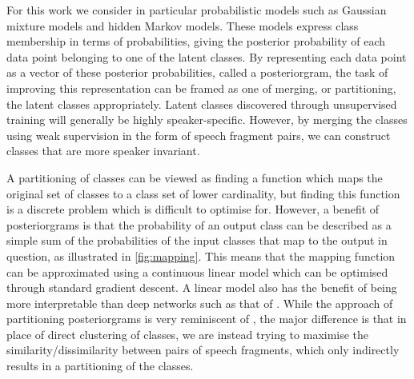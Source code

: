 For this work we consider in particular probabilistic models such as Gaussian mixture models and hidden Markov models.
These models express class membership in terms of probabilities, giving the posterior probability of each data point belonging to one of the latent classes.
By representing each data point as a vector of these posterior probabilities, called a posteriorgram, the task of improving this representation can be framed as one of merging, or partitioning, the latent classes appropriately.
Latent classes discovered through unsupervised training will generally be highly speaker-specific.
However, by merging the classes using weak supervision in the form of speech fragment pairs, we can construct classes that are more speaker invariant.

A partitioning of classes can be viewed as finding a function which maps the original set of classes to a class set of lower cardinality, but finding this function is a discrete problem which is difficult to optimise for.
However, a benefit of posteriorgrams is that the probability of an output class can be described as a simple sum of the probabilities of the input classes that map to the output in question, as illustrated in \cref{fig:mapping}.
This means that the mapping function can be approximated using a continuous linear model which can be optimised through standard gradient descent.
A linear model also has the benefit of being more interpretable than deep networks such as that of \textcite{thiolliere2015hybrid}.
While the approach of partitioning posteriorgrams is very reminiscent of \textcite{jansen2013weak}, the major difference is that in place of direct clustering of classes, we are instead trying to maximise the similarity/dissimilarity between pairs of speech fragments, which only indirectly results in a partitioning of the classes.


